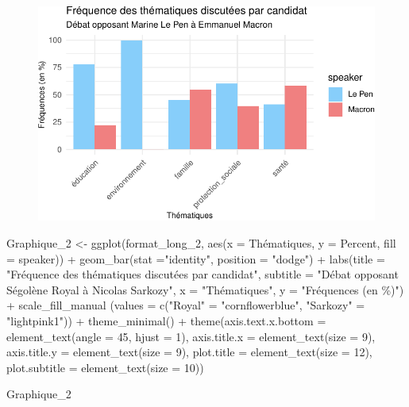 \documentclass[
  letterpaper,
  DIV=11,
  numbers=noendperiod]{scrartcl}
\newenvironment{Shaded}{\begin{snugshade}}{\end{snugshade}}
\newcommand{\AttributeTok}[1]{\textcolor[rgb]{0.40,0.45,0.13}{#1}}
\newcommand{\DecValTok}[1]{\textcolor[rgb]{0.68,0.00,0.00}{#1}}
\newcommand{\FunctionTok}[1]{\textcolor[rgb]{0.28,0.35,0.67}{#1}}
\newcommand{\NormalTok}[1]{\textcolor[rgb]{0.00,0.23,0.31}{#1}}
\newcommand{\OtherTok}[1]{\textcolor[rgb]{0.00,0.23,0.31}{#1}}
\newcommand{\SpecialCharTok}[1]{\textcolor[rgb]{0.37,0.37,0.37}{#1}}
\newcommand{\StringTok}[1]{\textcolor[rgb]{0.13,0.47,0.30}{#1}}
\begin{document}
\begin{figure}[H]

{\centering \includegraphics{Travail-Session_files/figure-pdf/unnamed-chunk-2-1.pdf}

}

\end{figure}

\begin{Shaded}
\begin{Highlighting}[]
\NormalTok{Graphique\_2 }\OtherTok{\textless{}{-}} \FunctionTok{ggplot}\NormalTok{(format\_long\_2, }\FunctionTok{aes}\NormalTok{(}\AttributeTok{x =}\NormalTok{ Thématiques, }\AttributeTok{y =}\NormalTok{ Percent, }\AttributeTok{fill =}\NormalTok{ speaker)) }\SpecialCharTok{+} \FunctionTok{geom\_bar}\NormalTok{(}\AttributeTok{stat =}\StringTok{"identity"}\NormalTok{, }\AttributeTok{position =} \StringTok{"dodge"}\NormalTok{) }\SpecialCharTok{+} \FunctionTok{labs}\NormalTok{(}\AttributeTok{title =} \StringTok{"Fréquence des thématiques discutées par candidat"}\NormalTok{, }\AttributeTok{subtitle =} \StringTok{"Débat opposant Ségolène Royal à Nicolas Sarkozy"}\NormalTok{, }\AttributeTok{x =} \StringTok{"Thématiques"}\NormalTok{, }\AttributeTok{y =} \StringTok{"Fréquences (en \%)"}\NormalTok{) }\SpecialCharTok{+} \FunctionTok{scale\_fill\_manual}\NormalTok{ (}\AttributeTok{values =} \FunctionTok{c}\NormalTok{(}\StringTok{"Royal"} \OtherTok{=} \StringTok{"cornflowerblue"}\NormalTok{, }\StringTok{"Sarkozy"} \OtherTok{=} \StringTok{"lightpink1"}\NormalTok{)) }\SpecialCharTok{+} \FunctionTok{theme\_minimal}\NormalTok{() }\SpecialCharTok{+} \FunctionTok{theme}\NormalTok{(}\AttributeTok{axis.text.x.bottom =} \FunctionTok{element\_text}\NormalTok{(}\AttributeTok{angle =} \DecValTok{45}\NormalTok{, }\AttributeTok{hjust =} \DecValTok{1}\NormalTok{), }\AttributeTok{axis.title.x =} \FunctionTok{element\_text}\NormalTok{(}\AttributeTok{size =} \DecValTok{9}\NormalTok{), }\AttributeTok{axis.title.y =} \FunctionTok{element\_text}\NormalTok{(}\AttributeTok{size =} \DecValTok{9}\NormalTok{), }\AttributeTok{plot.title =} \FunctionTok{element\_text}\NormalTok{(}\AttributeTok{size =} \DecValTok{12}\NormalTok{), }\AttributeTok{plot.subtitle =} \FunctionTok{element\_text}\NormalTok{(}\AttributeTok{size =} \DecValTok{10}\NormalTok{))}

\NormalTok{Graphique\_2}
\end{Highlighting}
\end{Shaded}
\end{document}
